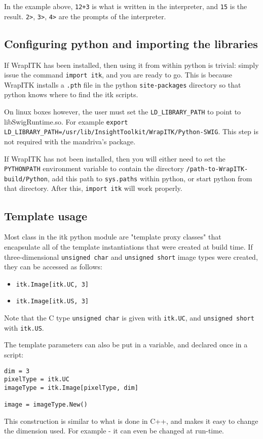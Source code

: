\documentclass{InsightArticle}
\begin{document}
In the example above, \verb$12+3$ is what is written in the interpreter, and
\verb$15$ is the result. \verb$2>$, \verb$3>$, \verb$4>$ are the prompts
of the interpreter.

     \subsection{Configuring python and importing the libraries}

If WrapITK has been installed, then using it from within python is trivial:
simply issue the command \verb$import itk$, and you are ready to go. This
is because WrapITK installs a \verb$.pth$ file in the python \verb$site-packages$ directory so
that python knows where to find the itk scripts.

On linux boxes however, the user must set the \verb$LD_LIBRARY_PATH$ to
point to libSwigRuntime.so. For example
\verb$export LD_LIBRARY_PATH=/usr/lib/InsightToolkit/WrapITK/Python-SWIG$.
This step is not required with the mandriva's package.

If WrapITK has not been installed, then you will either need to set the
\verb$PYTHONPATH$ environment variable to contain the directory
\verb$/path-to-WrapITK-build/Python$, add  this path to \verb$sys.paths$ within python, or
start python from that directory. After this, \verb$import itk$ will work
properly.

     \subsection{Template usage}
Most class in the itk python module are "template proxy classes" that
encapsulate all of the template instantiations that were created at build time.
If three-dimensional \verb$unsigned char$ and \verb$unsigned short$ image types were created,
they can be accessed as follows:
\begin{itemize}
  \item \verb$itk.Image[itk.UC, 3]$
  \item \verb$itk.Image[itk.US, 3]$
\end{itemize}
Note that the C type \verb$unsigned char$ is given with \verb$itk.UC$, and \verb$unsigned short$
with \verb$itk.US$.

The template parameters can also be put in a variable, and declared once
in a script:
\begin{verbatim}
dim = 3
pixelType = itk.UC
imageType = itk.Image[pixelType, dim]

image = imageType.New()
\end{verbatim}
This construction is similar to what is done in C++, and makes it easy to change
the dimension used. For example - it can even be changed at run-time.
\end{document}
